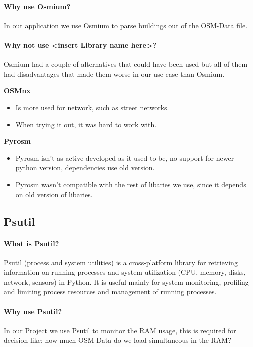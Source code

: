 \documentclass[parskip=full]{report} %
\begin{document}
\paragraph{Why use Osmium?}
In out application we use Osmium to parse buildings out of the OSM-Data file.

\paragraph{Why not use <insert Library name here>?}
Osmium had a couple of alternatives that could have been used but all of them had disadvantages that made them worse in our use case than Osmium. 
  
\textbf{OSMnx}
\begin{itemize}
    \item Is more used for network, such as street networks. 
    \item When trying it out, it was hard to work with.
\end{itemize}


\textbf{Pyrosm}
\begin{itemize}
    \item Pyrosm isn't as active developed as it used to be, no support for newer python version, dependencies use old version.
    \item Pyrosm wasn't compatible with the rest of libaries we use, since it depends on old version of libaries.
\end{itemize}

\subsection{Psutil}
\paragraph{What is Psutil?}
Psutil (process and system utilities) is a cross-platform library for retrieving information on running processes and system utilization (CPU, memory, disks, network, sensors) in Python. It is useful mainly for system monitoring, profiling and limiting process resources and management of running processes. 

\paragraph{Why use Psutil?}
In our Project we use Psutil to monitor the RAM usage, this is required for decision like: how much OSM-Data do we load simultaneous in the RAM?
\end{document}

